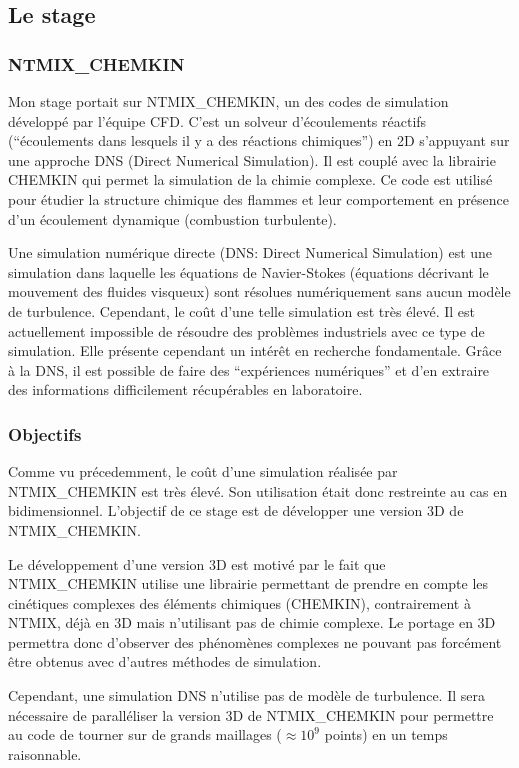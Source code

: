 \subsection{Le stage}
\subsubsection{NTMIX\_CHEMKIN}
Mon stage portait sur NTMIX\_CHEMKIN, un des codes de simulation développé par l'équipe CFD. C'est un solveur d'écoulements réactifs (``écoulements dans lesquels il y a des réactions chimiques'') en 2D s'appuyant sur une approche DNS (Direct Numerical Simulation). Il est couplé avec la librairie CHEMKIN qui permet la simulation de la chimie complexe. Ce code est utilisé pour étudier la structure chimique des flammes et leur comportement en présence d'un écoulement dynamique (combustion turbulente).\cite{cerfacs}



Une simulation numérique directe (DNS: Direct Numerical Simulation) est une simulation dans laquelle les équations de Navier-Stokes (équations décrivant le mouvement des fluides visqueux) sont résolues numériquement sans aucun modèle de turbulence. Cependant, le coût d'une telle simulation est très élevé. Il est actuellement impossible de résoudre des problèmes industriels avec ce type de simulation. Elle présente cependant un intérêt en recherche fondamentale. Grâce à la DNS, il est possible de faire des ``expériences numériques'' et d'en extraire des informations difficilement récupérables en laboratoire.\cite{cfd-online-DNS}


\subsubsection{Objectifs}
Comme vu précedemment, le coût d'une simulation réalisée par NTMIX\_CHEMKIN est très élevé. Son utilisation était donc restreinte au cas en bidimensionnel. L'objectif de ce stage est de développer une version 3D de NTMIX\_CHEMKIN.


Le développement d'une version 3D est motivé par le fait que NTMIX\_CHEMKIN utilise une librairie permettant de prendre en compte les cinétiques complexes des éléments chimiques (CHEMKIN), contrairement à NTMIX, déjà en 3D mais n'utilisant pas de chimie complexe. Le portage en 3D permettra donc d'observer des phénomènes complexes ne pouvant pas forcément être obtenus avec d'autres méthodes de simulation.


Cependant, une simulation DNS n'utilise pas de modèle de turbulence. Il sera nécessaire de paralléliser la version 3D de NTMIX\_CHEMKIN pour permettre au code de tourner sur de grands maillages ($\approx 10^9$ points) en un temps raisonnable.


